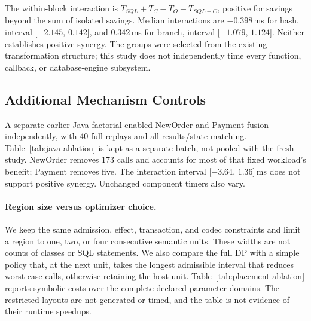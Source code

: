\documentclass[acmsmall,screen,review,anonymous]{acmart}
\begin{document}
The within-block interaction is
$T_{SQL}+T_C-T_O-T_{SQL+C}$, positive for savings beyond the sum of isolated
savings. Median interactions are $-0.398$\,ms for hash, interval
[$-2.145$, $0.142$], and $0.342$\,ms for branch, interval [$-1.079$, $1.124$].
Neither establishes positive synergy. The groups were selected from the
existing transformation structure; this study does not independently time every
function, callback, or database-engine subsystem.

\subsection{Additional Mechanism Controls}
\label{sec:ablations}
A separate earlier Java factorial enabled NewOrder and Payment fusion
independently, with 40 full replays and all results/state matching. Table~\ref{tab:java-ablation}
is kept as a separate batch, not pooled with the fresh study. NewOrder removes
173 calls and accounts for most of that fixed workload's benefit; Payment removes
five. The interaction interval [$-3.64$, $1.36$]\,ms does not support positive
synergy. Unchanged component timers also vary.

\begin{table}[t]
\caption{Historical Java region factorial, retained separately. Paired ratios
are medians of eight within-block original/candidate ratios.}
\label{tab:java-ablation}
\small\JavaRegionResults
\end{table}

\paragraph{Region size versus optimizer choice.}
We keep the same admission, effect, transaction, and codec constraints and
limit a region to one, two, or four consecutive semantic units. These widths
are not counts of classes or SQL statements. We also compare the full DP
with a simple policy that, at the next unit, takes the longest admissible
interval that reduces worst-case calls, otherwise retaining the host unit.
Table~\ref{tab:placement-ablation} reports symbolic costs over the complete
declared parameter domains. The restricted layouts are not generated or
timed, and the table is not evidence of their runtime speedups.
\end{document}
